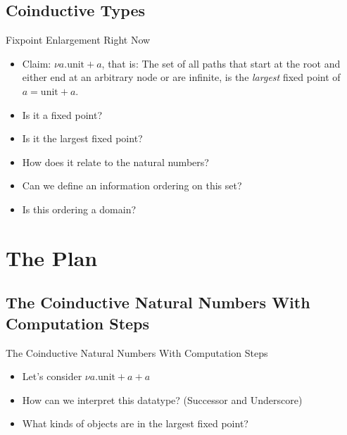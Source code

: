 \documentclass{beamer}
\begin{document}
\subsection{Coinductive Types}

\begin{frame}{Fixpoint Enlargement Right Now}

  \begin{itemize}
    \item Claim: $\nu a . \text{unit} + a$, that is: The set of all paths that start
          at the root and either end at an arbitrary node or are infinite, is
          the \emph{largest} fixed point of $a = \text{unit} + a$.
    \item Is it a fixed point?
    \item Is it the largest fixed point?
    \item How does it relate to the natural numbers?
    \item Can we define an information ordering on this set?
    \item Is this ordering a domain?
  \end{itemize}

\end{frame}


\section{The Plan}

\subsection{The Coinductive Natural Numbers With Computation Steps}

\begin{frame}{The Coinductive Natural Numbers With Computation Steps}

  \begin{itemize}
    \item
      Let's consider $\nu a . \text{unit} + a + a$
    \item
      How can we interpret this datatype? (Successor and Underscore)
    \item
      What kinds of objects are in the largest fixed point?
  \end{itemize}

  \begin{center}
  \end{center}

\end{frame}
\end{document}

